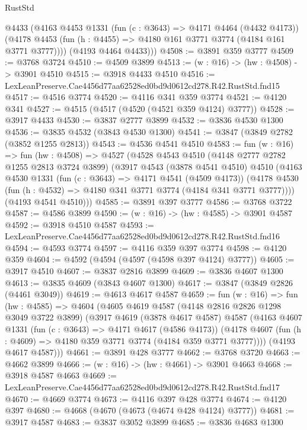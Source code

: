 \begin{lexlean}{RustStd}
\begin{coremodule}
        @4433
        (@4163
          @4453
          @1331
          (fun (c : @3643) => @4171 @4464 (@4432 @4173))
          (@4178 @4453 (fun (h : @4455) => @4180 @161 @3771 @3774 (@4184 @161 @3771 @3777))))
        (@4193 @4464 @4433)))
@4508 := @3891 @359 @3777
@4509 := @3768 @3724
@4510 := @4509 @3899
@4513 := (w : @16) -> (hw : @4508) -> @3901 @4510
@4515 := @3918 @4433 @4510
@4516 := LexLeanPreserve.Cae4456d77aa62528ed0bd9d0612cd278.R42.RustStd.fnd15
@4517 := @4516 @3774
@4520 := @4116 @341 @359 @3774
@4521 := @4120 @341
@4527 := @4515 (@4517 (@4520 (@4521 @359 @4124) @3777))
@4528 := @3917 @4433
@4530 := @3837 @2777 @3899
@4532 := @3836 @4530 @1300
@4536 := @3835 @4532 (@3843 @4530 @1300)
@4541 := @3847 (@3849 @2782 (@3852 @1255 @2813))
@4543 := @4536 @4541 @4510
@4583 := fun (w : @16) =>
  fun (hw : @4508) =>
  @4527
    (@4528
      @4543
      @4510
      (@4148 @2777 @2782 @1255 @2813 @3724 @3899)
      (@3917
        @4543
        (@3878 @4541 @4510)
        @4510
        (@4163
          @4530
          @1331
          (fun (c : @3643) => @4171 @4541 (@4509 @4173))
          (@4178 @4530 (fun (h : @4532) => @4180 @341 @3771 @3774 (@4184 @341 @3771 @3777))))
        (@4193 @4541 @4510)))
@4585 := @3891 @397 @3777
@4586 := @3768 @3722
@4587 := @4586 @3899
@4590 := (w : @16) -> (hw : @4585) -> @3901 @4587
@4592 := @3918 @4510 @4587
@4593 := LexLeanPreserve.Cae4456d77aa62528ed0bd9d0612cd278.R42.RustStd.fnd16
@4594 := @4593 @3774
@4597 := @4116 @359 @397 @3774
@4598 := @4120 @359
@4604 := @4592 (@4594 (@4597 (@4598 @397 @4124) @3777))
@4605 := @3917 @4510
@4607 := @3837 @2816 @3899
@4609 := @3836 @4607 @1300
@4613 := @3835 @4609 (@3843 @4607 @1300)
@4617 := @3847 (@3849 @2826 (@4461 @3049))
@4619 := @4613 @4617 @4587
@4659 := fun (w : @16) =>
  fun (hw : @4585) =>
  @4604
    (@4605
      @4619
      @4587
      (@4148 @2816 @2826 @1298 @3049 @3722 @3899)
      (@3917
        @4619
        (@3878 @4617 @4587)
        @4587
        (@4163
          @4607
          @1331
          (fun (c : @3643) => @4171 @4617 (@4586 @4173))
          (@4178 @4607 (fun (h : @4609) => @4180 @359 @3771 @3774 (@4184 @359 @3771 @3777))))
        (@4193 @4617 @4587)))
@4661 := @3891 @428 @3777
@4662 := @3768 @3720
@4663 := @4662 @3899
@4666 := (w : @16) -> (hw : @4661) -> @3901 @4663
@4668 := @3918 @4587 @4663
@4669 := LexLeanPreserve.Cae4456d77aa62528ed0bd9d0612cd278.R42.RustStd.fnd17
@4670 := @4669 @3774
@4673 := @4116 @397 @428 @3774
@4674 := @4120 @397
@4680 := @4668 (@4670 (@4673 (@4674 @428 @4124) @3777))
@4681 := @3917 @4587
@4683 := @3837 @3052 @3899
@4685 := @3836 @4683 @1300

\end{coremodule}
\end{lexlean}
